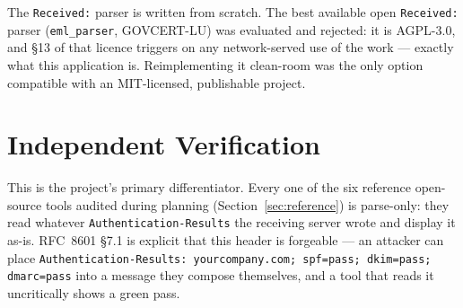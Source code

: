\documentclass[11pt,a4paper]{article}
\begin{document}
The \texttt{Received:} parser is written from scratch. The best available open
\texttt{Received:} parser (\texttt{eml\_parser}, GOVCERT-LU) was evaluated and rejected: it is
AGPL-3.0, and \S13 of that licence triggers on any network-served use of the work — exactly
what this application is. Reimplementing it clean-room was the only option compatible with an
MIT-licensed, publishable project.

\section{Independent Verification}
\label{sec:verification}

This is the project's primary differentiator. Every one of the six reference open-source
tools audited during planning (Section~\ref{sec:reference}) is parse-only: they read whatever
\texttt{Authentication-Results} the receiving server wrote and display it as-is. RFC~8601
\S7.1 is explicit that this header is forgeable — an attacker can place
\texttt{Authentication-Results: yourcompany.com; spf=pass; dkim=pass; dmarc=pass} into a
message they compose themselves, and a tool that reads it uncritically shows a green pass.
\end{document}
